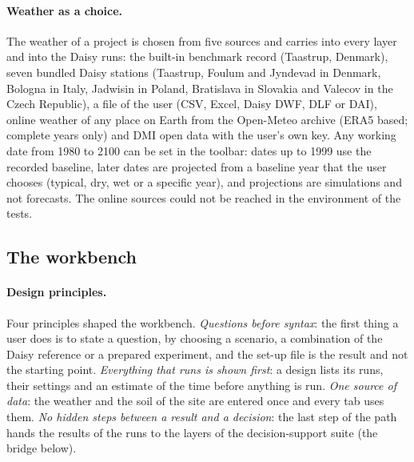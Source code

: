 \paragraph{Weather as a choice.}
The weather of a project is chosen from five sources and carries into every layer and into the Daisy runs: the built-in benchmark record (Taastrup, Denmark), seven bundled Daisy stations (Taastrup, Foulum and Jyndevad in Denmark, Bologna in Italy, Jadwisin in Poland, Bratislava in Slovakia and Valecov in the Czech Republic), a file of the user (CSV, Excel, Daisy DWF, DLF or DAI), online weather of any place on Earth from the Open-Meteo archive (ERA5 based; complete years only) and DMI open data with the user's own key. Any working date from 1980 to 2100 can be set in the toolbar: dates up to 1999 use the recorded baseline, later dates are projected from a baseline year that the user chooses (typical, dry, wet or a specific year), and projections are simulations and not forecasts. The online sources could not be reached in the environment of the tests.

\subsection{The workbench}
\paragraph{Design principles.}
Four principles shaped the workbench. \emph{Questions before syntax}: the first thing a user does is to state a question, by choosing a scenario, a combination of the Daisy reference or a prepared experiment, and the set-up file is the result and not the starting point. \emph{Everything that runs is shown first}: a design lists its runs, their settings and an estimate of the time before anything is run. \emph{One source of data}: the weather and the soil of the site are entered once and every tab uses them. \emph{No hidden steps between a result and a decision}: the last step of the path hands the results of the runs to the layers of the decision-support suite (the bridge below).

